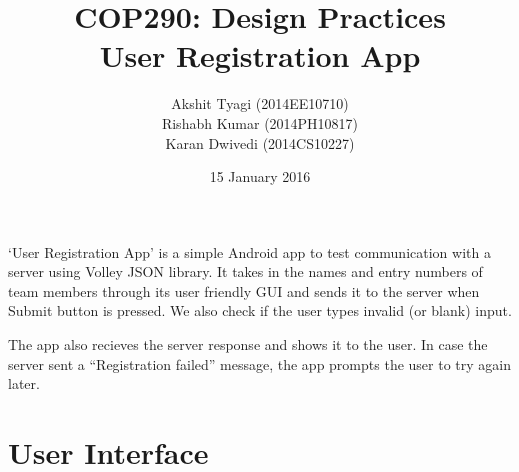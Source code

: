\documentclass[12pt,a4paper,titlepage]{article}
\title{COP290: Design Practices\break\\User Registration App}
\author{Akshit Tyagi (2014EE10710) \\ Rishabh Kumar (2014PH10817) \\ Karan Dwivedi (2014CS10227) }
\date{15 January 2016}
\begin{document}
\maketitle

`User Registration App' is a simple Android app to test communication with a server using Volley JSON library. It takes in the names and entry numbers of team members through its user friendly GUI and sends it to the server when Submit button is pressed. We also check if the user types invalid (or blank) input.

The app also recieves the server response and shows it to the user. In case the server sent a ``Registration failed'' message, the app prompts the user to try again later.

\section{User Interface}
\end{document}
